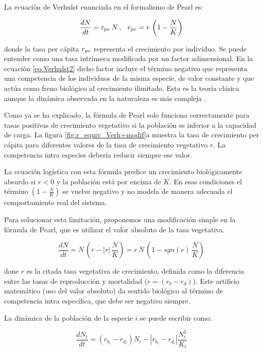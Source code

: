 La ecuación de Verhulst enunciada en el formalismo de Pearl es:

\begin{equation}
\frac{dN}{dt}=r_{\rm{pc}} \, N \, , \; \;\, r_{\rm{pc}}=r\, \left(1-\frac{N}{K}\right)
\label{eq:Verhulst2}
\end{equation}

\noindent  donde la tasa per cápita $r_{\rm{pc}}$ representa el crecimiento por individuo. Se puede entender como una tasa intrínseca 
modificada por un factor adimensional. En la ecuación \ref{eq:Verhulst2} dicho factor incluye el término negativo que representa una
competencia de los individuos de la misma especie, de valor constante y que actúa como freno biológico al crecimiento ilimitado. Esta
es la teoría clásica aunque la dinámica observada en la naturaleza es más compleja \cite{johnson2013}.

Como ya se ha explicado, la fórmula de Pearl solo funciona correctamente para tasas positivas de crecimiento vegetativo si la población
es inferior a la capacidad de carga. La figura \ref{fig:r_equiv_Verh+modif}a muestra la tasa de crecimiento per cápita para diferentes valores de la tasa de
crecimiento vegetativo $r$. La competencia intra especies debería reducir siempre ese valor.

La ecuación logística con esta fórmula predice un crecimiento biológicamente absurdo si $r<0$ y la población está por encima de $K$. En esas condiciones el término $\left(1-\frac{N}{K}\right)$ se vuelve negativo y no modela de manera adecuada el comportamiento real del sistema. 

Para solucionar esta limitación, proponemos una modificación simple en la fórmula de Pearl, que es utilizar el valor absoluto de la tasa vegetativa.

\begin{equation}
\frac{dN}{dt}= N \, \left(r - |r|\,    \frac{N}{K}\right)= r\,N \,\left(1-sgn(r)\,\frac{N}{K}\right)
\label{eq:Verh_r}
\end{equation}

\noindent done $r$ es la citada tasa vegetativa de crecimiento, definida como la diferencia entre las tasas de reproducción y mortalidad ($r=\left(r_{b}-r_{d}\right)$). Este artificio matemático (uso del valor absoluto) da sentido biológico al término de competencia intra específica, que debe ser negativo siempre.

La dinámica de la población de la especie $i$ se puede escribir como:

\begin{equation}
\displaystyle \frac{dN_i}{dt}=\left(r_{b_i}-r_{d_i}\right) N_i - |r_{b_i}-r_{d_i}| \frac{N^2_i}{K_i}
\label{ec:vhoptionI}
\end{equation}


